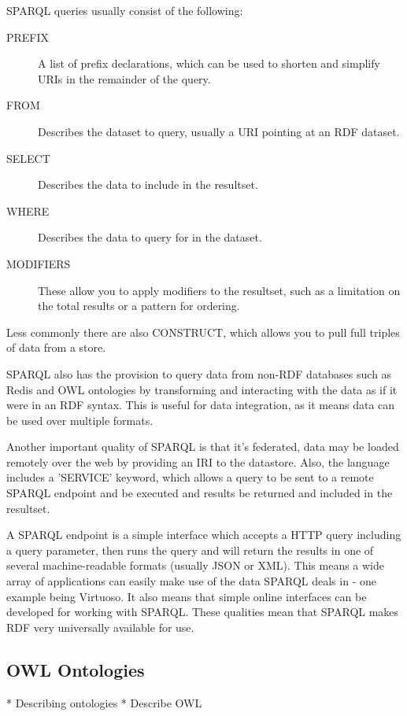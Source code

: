 \documentclass{article}
\begin{document}
SPARQL queries usually consist of the following:

\begin{description}
    \item[PREFIX] A list of prefix declarations, which can be used to shorten
    and simplify URIs in the remainder of the query.
    \item[FROM] Describes the dataset to query, usually a URI pointing at an RDF
    dataset.
    \item[SELECT] Describes the data to include in the resultset.
    \item[WHERE] Describes the data to query for in the dataset.
    \item[MODIFIERS] These allow you to apply modifiers to the resultset, such
    as a limitation on the total results or a pattern for ordering.
\end{description}

Less commonly there are also CONSTRUCT, which allows you to pull full triples of
data from a store.

SPARQL also has the provision to query data from non-RDF databases such as Redis
and OWL ontologies by transforming and interacting with the data as if it were
in an RDF syntax. This is useful for data integration, as it means data can be
used over multiple formats. 

Another important quality of SPARQL is that it's federated, data may be loaded
remotely over the web by providing an IRI to the datastore. Also, the language
includes a 'SERVICE' keyword, which allows a query to be sent to a remote SPARQL
endpoint and be executed and results be returned and included in the resultset.

A SPARQL endpoint is a simple interface which accepts a HTTP query including a
query parameter, then runs the query and will return the results in one of 
several machine-readable formats (usually JSON or XML). This means a wide array
of applications can easily make use of the data SPARQL deals in - one example
being Virtuoso. It also means that simple online interfaces can be developed for 
working with SPARQL. These qualities mean that SPARQL makes RDF very universally
available for use.

\subsection{OWL Ontologies}

* Describing ontologies
* Describe OWL
\end{document}
